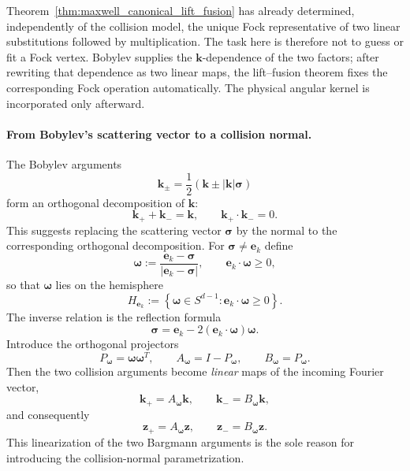 \documentclass[11pt,oneside]{article}
\numberwithin{equation}{section}
\theoremstyle{definition}
\begin{document}
Theorem~\ref{thm:maxwell_canonical_lift_fusion} has already determined, independently of the collision model, the unique Fock representative of two linear substitutions followed by multiplication.  The task here is therefore not to guess or fit a Fock vertex.  Bobylev supplies the $\bm k$-dependence of the two factors; after rewriting that dependence as two linear maps, the lift--fusion theorem fixes the corresponding Fock operation automatically.  The physical angular kernel is incorporated only afterward.

\paragraph{From Bobylev's scattering vector to a collision normal.}
The Bobylev arguments
\begin{equation}
\bm k_\pm=\frac12\left(\bm k\pm|\bm k|\bm\sigma\right)
\end{equation}
form an orthogonal decomposition of $\bm k$:
\begin{equation}
\bm k_++\bm k_-=\bm k,
\qquad
\bm k_+\cdot\bm k_-=0.
\end{equation}
This suggests replacing the scattering vector $\bm\sigma$ by the normal to the corresponding orthogonal decomposition.  For $\bm\sigma\neq\bm e_k$ define
\begin{equation}
\bm\omega
:=
\frac{\bm e_k-\bm\sigma}{|\bm e_k-\bm\sigma|},
\qquad
\bm e_k\cdot\bm\omega\ge0,
\label{eq:maxwell_omega_def}
\end{equation}
so that $\bm\omega$ lies on the hemisphere
\begin{equation}
H_{\bm e_k}
:=
\left\{\bm\omega\in S^{d-1}:\bm e_k\cdot\bm\omega\ge0\right\}.
\end{equation}
The inverse relation is the reflection formula
\begin{equation}
\bm\sigma
=
\bm e_k
-2(\bm e_k\cdot\bm\omega)\bm\omega .
\label{eq:maxwell_sigma_omega_relation}
\end{equation}
Introduce the orthogonal projectors
\begin{equation}
P_{\bm\omega}=\bm\omega\bm\omega^T,
\qquad
A_{\bm\omega}=I-P_{\bm\omega},
\qquad
B_{\bm\omega}=P_{\bm\omega}.
\label{eq:maxwell_AB_projectors}
\end{equation}
Then the two collision arguments become \emph{linear} maps of the incoming Fourier vector,
\begin{equation}
\bm k_+=A_{\bm\omega}\bm k,
\qquad
\bm k_-=B_{\bm\omega}\bm k,
\label{eq:maxwell_collision_normal_k}
\end{equation}
and consequently
\begin{equation}
\bm z_+=A_{\bm\omega}\bm z,
\qquad
\bm z_-=B_{\bm\omega}\bm z .
\label{eq:maxwell_collision_normal_z}
\end{equation}
This linearization of the two Bargmann arguments is the sole reason for introducing the collision-normal parametrization.
\end{document}
